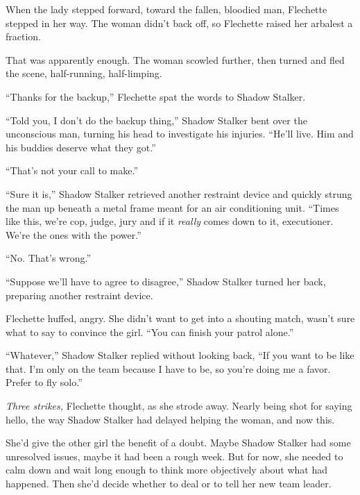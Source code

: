 When the lady stepped forward, toward the fallen, bloodied man, Flechette stepped in her way.  The woman didn't back off, so Flechette raised her arbalest a fraction.



That was apparently enough.  The woman scowled further, then turned and fled the scene, half-running, half-limping.



``Thanks for the backup,'' Flechette spat the words to Shadow Stalker.



``Told you, I don't do the backup thing,'' Shadow Stalker bent over the unconscious man, turning his head to investigate his injuries.  ``He'll live.  Him and his buddies deserve what they got.''



``That's not your call to make.''



``Sure it is,'' Shadow Stalker retrieved another restraint device and quickly strung the man up beneath a metal frame meant for an air conditioning unit.  ``Times like this, we're cop, judge, jury and if it \emph{really }comes down to it, executioner.  We're the ones with the power.''



``No.  That's wrong.''



``Suppose we'll have to agree to disagree,'' Shadow Stalker turned her back, preparing another restraint device.



Flechette huffed, angry.  She didn't want to get into a shouting match, wasn't sure what to say to convince the girl.  ``You can finish your patrol alone.''



``Whatever,'' Shadow Stalker replied without looking back, ``If you want to be like that.  I'm only on the team because I have to be, so you're doing me a favor.  Prefer to fly solo.''



\emph{Three strikes,} Flechette thought, as she strode away.  Nearly being shot for saying hello, the way Shadow Stalker had delayed helping the woman, and now this.



She'd give the other girl the benefit of a doubt.  Maybe Shadow Stalker had some unresolved issues, maybe it had been a rough week.  But for now, she needed to calm down and wait long enough to think more objectively about what had happened.  Then she'd decide whether to deal or to tell her new team leader.



